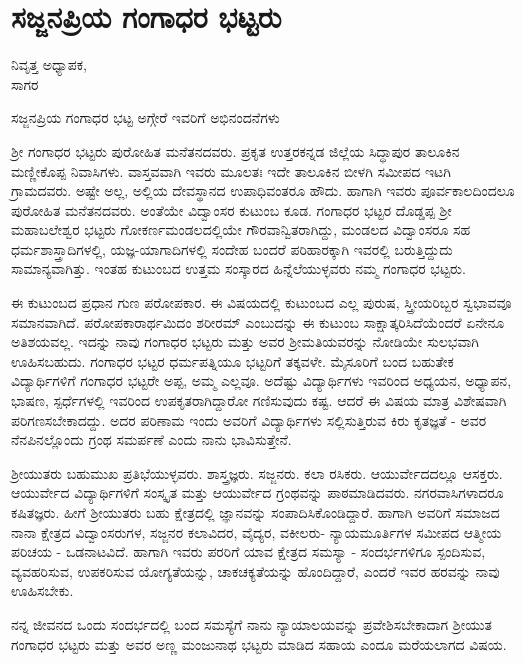 \chapter{ಸಜ್ಜನಪ್ರಿಯ ಗಂಗಾಧರ ಭಟ್ಟರು}

\begin{center}
\smallskip

ನಿವೃತ್ತ ಅಧ್ಯಾಪಕ,\\ 
ಸಾಗರ
\end{center}

ಸಜ್ಜನಪ್ರಿಯ ಗಂಗಾಧರ ಭಟ್ಟ ಅಗ್ಗೇರೆ ಇವರಿಗೆ ಅಭಿನಂದನೆಗಳು

ಶ್ರೀ ಗಂಗಾಧರ ಭಟ್ಟರು ಪುರೋಹಿತ ಮನೆತನದವರು. ಪ್ರಕೃತ  ಉತ್ತರಕನ್ನಡ ಜಿಲ್ಲೆಯ ಸಿದ್ಧಾಪುರ ತಾಲೂಕಿನ ಮಣ್ಣೀಕೊಪ್ಪ ನಿವಾಸಿಗಳು. ವಾಸ್ತವವಾಗಿ ಇವರು ಮೂಲತಃ ಇದೇ ತಾಲೂಕಿನ ಬೀಳಗಿ ಸಮೀಪದ ಇಟಗಿ ಗ್ರಾಮದವರು. ಅಷ್ಟೇ ಅಲ್ಲ, ಅಲ್ಲಿಯ ದೇವಸ್ಥಾನದ ಉಪಾಧಿವಂತರೂ ಹೌದು. ಹಾಗಾಗಿ ಇವರು ಪೂರ್ವಕಾಲದಿಂದಲೂ ಪುರೋಹಿತ ಮನೆತನದವರು. ಅಂತೆಯೇ ವಿದ್ವಾಂಸರ ಕುಟುಂಬ ಕೂಡ. ಗಂಗಾಧರ ಭಟ್ಟರ ದೊಡ್ಡಪ್ಪ ಶ್ರೀ ಮಹಾಬಲೇಶ್ವರ ಭಟ್ಟರು ಗೋಕರ್ಣಮಂಡಲದಲ್ಲಿಯೇ ಗೌರವಾನ್ವಿತರಾಗಿದ್ದು, ಮಂಡಲದ ವಿದ್ವಾಂಸರೂ ಸಹ ಧರ್ಮಶಾಸ್ತ್ರಾದಿಗಳಲ್ಲಿ, ಯಜ್ಞ-ಯಾಗಾದಿಗಳಲ್ಲಿ ಸಂದೇಹ ಬಂದರೆ ಪರಿಹಾರಕ್ಕಾಗಿ ಇವರಲ್ಲಿ ಬರುತ್ತಿದ್ದುದು ಸಾಮಾನ್ಯವಾಗಿತ್ತು. ಇಂತಹ ಕುಟುಂಬದ ಉತ್ತಮ ಸಂಸ್ಕಾರದ ಹಿನ್ನೆಲೆಯುಳ್ಳವರು ನಮ್ಮ ಗಂಗಾಧರ ಭಟ್ಟರು.

ಈ ಕುಟುಂಬದ ಪ್ರಧಾನ ಗುಣ ಪರೋಪಕಾರ. ಈ ವಿಷಯದಲ್ಲಿ ಕುಟುಂಬದ ಎಲ್ಲ ಪುರುಷ, ಸ್ತ್ರೀಯರಿಬ್ಬರ ಸ್ವಭಾವವೂ ಸಮಾನವಾಗಿದೆ. ಪರೋಪಕಾರಾರ್ಥಮಿದಂ ಶರೀರಮ್ ಎಂಬುದನ್ನು ಈ ಕುಟುಂಬ ಸಾಕ್ಷಾತ್ಕರಿಸಿದೆಯೆಂದರೆ ಏನೇನೂ ಅತಿಶಯವಲ್ಲ. ಇದನ್ನು ನಾವು ಗಂಗಾಧರ ಭಟ್ಟರು ಮತ್ತು ಅವರ ಶ್ರೀಮತಿಯವರನ್ನು ನೋಡಿಯೇ ಸುಲಭವಾಗಿ ಊಹಿಸಬಹುದು. ಗಂಗಾಧರ ಭಟ್ಟರ ಧರ್ಮಪತ್ನಿಯೂ ಭಟ್ಟರಿಗೆ ತಕ್ಕವಳೇ. ಮೈಸೂರಿಗೆ ಬಂದ ಬಹುತೇಕ ವಿದ್ಯಾರ್ಥಿಗಳಿಗೆ ಗಂಗಾಧರ ಭಟ್ಟರೇ ಅಪ್ಪ, ಅಮ್ಮ ಎಲ್ಲವೂ. ಅದೆಷ್ಟು ವಿದ್ಯಾರ್ಥಿಗಳು ಇವರಿಂದ ಅಧ್ಯಯನ, ಅಧ್ಯಾಪನ, ಭಾಷಣ, ಸ್ಪರ್ಧೆಗಳಲ್ಲಿ ಇವರಿಂದ ಉಪಕೃತರಾಗಿದ್ದಾರೋ ಗಣಿಸುವುದು ಕಷ್ಟ. ಆದರೆ ಈ ವಿಷಯ ಮಾತ್ರ ವಿಶೇಷವಾಗಿ ಪರಿಗಣಸಬೇಕಾದದ್ದು. ಅದರ ಪರಿಣಾಮ ಇಂದು ಅವರಿಗೆ ವಿದ್ಯಾರ್ಥಿಗಳು ಸಲ್ಲಿಸುತ್ತಿರುವ ಕಿರು ಕೃತಜ್ಞತೆ - ಅವರ ನೆನಪಿನಲ್ಲೊಂದು ಗ್ರಂಥ ಸಮರ್ಪಣೆ ಎಂದು ನಾನು ಭಾವಿಸುತ್ತೇನೆ.

ಶ್ರೀಯುತರು ಬಹುಮುಖ ಪ್ರತಿಭೆಯುಳ್ಳವರು. ಶಾಸ್ತ್ರಜ್ಞರು. ಸಜ್ಜನರು. ಕಲಾ ರಸಿಕರು. ಆಯುರ್ವೇದದಲ್ಲೂ ಆಸಕ್ತರು. ಆಯುರ್ವೇದ ವಿದ್ಯಾರ್ಥಿಗಳಿಗೆ ಸಂಸ್ಕೃತ ಮತ್ತು ಆಯುರ್ವೇದ ಗ್ರಂಥವನ್ನು ಪಾಠಮಾಡಿದವರು. ನಗರವಾಸಿಗಳಾದರೂ ಕಷಿತಜ್ಞರು. ಹೀಗೆ ಶ್ರೀಯುತರು ಬಹು ಕ್ಷೇತ್ರದಲ್ಲಿ ಜ್ಞಾನವನ್ನು ಸಂಪಾದಿಸಿಕೊಂಡಿದ್ದಾರೆ. ಹಾಗಾಗಿ ಅವರಿಗೆ ಸಮಾಜದ ನಾನಾ ಕ್ಷೇತ್ರದ ವಿದ್ವಾಂಸರುಗಳ, ಸಜ್ಜನರ ಕಲಾವಿದರ, ವೈದ್ಯರ, ವಕೀಲರು- ನ್ಯಾಯಮೂರ್ತಿಗಳ ಸಮೀಪದ ಆತ್ಮೀಯ ಪರಿಚಯ - ಒಡನಾಟವಿದೆ. ಹಾಗಾಗಿ ಇವರು ಪರರಿಗೆ ಯಾವ ಕ್ಷೇತ್ರದ ಸಮಸ್ಯಾ - ಸಂದರ್ಭಗಳಿಗೂ ಸ್ಪಂದಿಸುವ, ವ್ಯವಹರಿಸುವ, ಉಪಕರಿಸುವ ಯೋಗ್ಯತೆಯನ್ನು, ಚಾಕಚಕ್ಯತೆಯನ್ನು ಹೊಂದಿದ್ದಾರೆ, ಎಂದರೆ ಇವರ ಹರವನ್ನು ನಾವು ಊಹಿಸಬೇಕು. 

ನನ್ನ ಜೀವನದ ಒಂದು ಸಂದರ್ಭದಲ್ಲಿ  ಬಂದ ಸಮಸ್ಯೆಗೆ ನಾನು ನ್ಯಾಯಾಲಯವನ್ನು ಪ್ರವೇಶಿಸಬೇಕಾದಾಗ ಶ್ರೀಯುತ ಗಂಗಾಧರ ಭಟ್ಟರು ಮತ್ತು ಅವರ ಅಣ್ಣ ಮಂಜುನಾಥ ಭಟ್ಟರು ಮಾಡಿದ ಸಹಾಯ ಎಂದೂ ಮರೆಯಲಾಗದ ವಿಷಯ.

